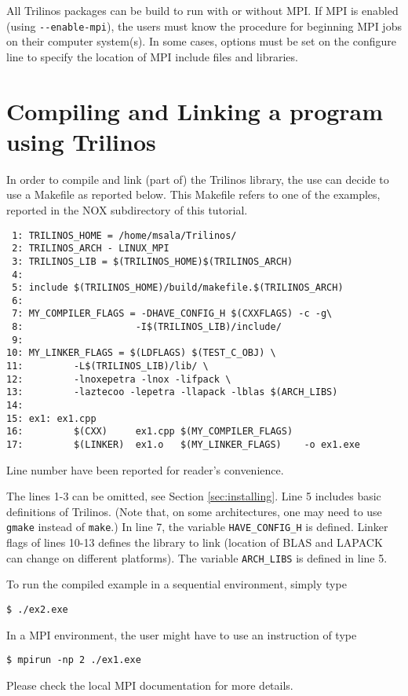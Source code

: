 \begin{remark}
  All Trilinos packages can be build to run with or without MPI. If MPI
  is enabled (using \verb!--enable-mpi!), the users must know the
  procedure for beginning MPI jobs on their computer system(s). In some
  cases, options must be set on the configure line to specify the
  location of MPI include files and libraries.
\end{remark}


\section{Compiling and Linking a program using Trilinos}
\label{sec:intro_compiling}

In order to compile and link (part of) the Trilinos library, the use can
decide to use a Makefile as reported below. This Makefile refers to one
of the examples, reported in the NOX subdirectory of this tutorial.
\begin{verbatim}
 1: TRILINOS_HOME = /home/msala/Trilinos/
 2: TRILINOS_ARCH - LINUX_MPI
 3: TRILINOS_LIB = $(TRILINOS_HOME)$(TRILINOS_ARCH)
 4: 
 5: include $(TRILINOS_HOME)/build/makefile.$(TRILINOS_ARCH)
 6: 
 7: MY_COMPILER_FLAGS = -DHAVE_CONFIG_H $(CXXFLAGS) -c -g\
 8:                    -I$(TRILINOS_LIB)/include/
 9:
10: MY_LINKER_FLAGS = $(LDFLAGS) $(TEST_C_OBJ) \
11:         -L$(TRILINOS_LIB)/lib/ \
12:         -lnoxepetra -lnox -lifpack \
13:         -laztecoo -lepetra -llapack -lblas $(ARCH_LIBS)
14:
15: ex1: ex1.cpp
16:         $(CXX)     ex1.cpp $(MY_COMPILER_FLAGS)
17:         $(LINKER)  ex1.o   $(MY_LINKER_FLAGS)    -o ex1.exe
\end{verbatim}

Line number have been reported for  reader's convenience. 

The lines 1-3 can be omitted, see Section \ref{sec:installing}.  Line 5
includes basic definitions of Trilinos. (Note that, on some
architectures, one may need to use \verb!gmake! instead of \verb!make!.)
In line 7, the variable \verb!HAVE_CONFIG_H! is defined. Linker flags of
lines 10-13 defines the library to link (location of BLAS and LAPACK can
change on different platforms). The variable \verb!ARCH_LIBS! is defined
in line 5.

To run the compiled example in a sequential environment, simply type
\begin{verbatim}
$ ./ex2.exe
\end{verbatim}
In a MPI environment, the user might have to
use an instruction of type
\begin{verbatim}
$ mpirun -np 2 ./ex1.exe
\end{verbatim}
Please check the local MPI documentation for more details. 

